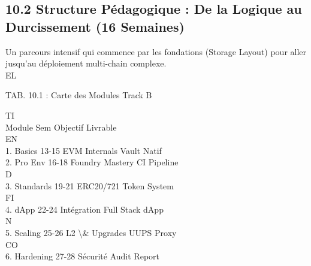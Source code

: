 \documentclass[12pt,landscape,a4paper]{article}
\begin{document}
\subsection{10.2 Structure Pédagogique : De la Logique au Durcissement (16 Semaines)}
Un parcours intensif qui commence par les fondations (Storage Layout) pour aller jusqu’au déploiement multi-chain complexe.\\
\vspace{0.5em}
\vspace{0.5em}
\vspace{0.5em}
\vspace{0.5em}
EL\\
\begin{center}\begin{tabular}TAB. 10.1 : Carte des Modules Track B\end{tabular}\end{center}
\vspace{0.5em}
\vspace{0.5em}
\vspace{0.5em}
\vspace{0.5em}
TI\\
Module       Sem Objectif          Livrable\\
\vspace{0.5em}
\vspace{0.5em}
\vspace{0.5em}
\vspace{0.5em}
EN\\
1. Basics    13-15 EVM Internals   Vault Natif\\
2. Pro Env   16-18 Foundry Mastery CI Pipeline\\
\vspace{0.5em}
\vspace{0.5em}
\vspace{0.5em}
\vspace{0.5em}
D\\
3. Standards 19-21 ERC20/721       Token System\\
\vspace{0.5em}
\vspace{0.5em}
\vspace{0.5em}
\vspace{0.5em}
FI\\
4. dApp      22-24 Intégration     Full Stack dApp\\
\vspace{0.5em}
N\\
5. Scaling   25-26 L2 \textbackslash{}& Upgrades   UUPS Proxy\\
CO\\
6. Hardening 27-28 Sécurité        Audit Report\\
\vspace{0.5em}
\vspace{0.5em}
\vspace{0.5em}
\vspace{0.5em}
\end{document}
